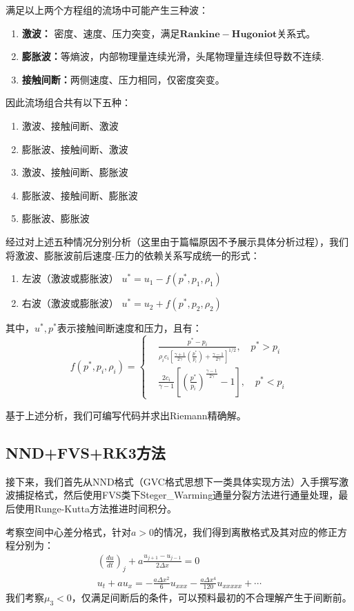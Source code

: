 \documentclass[12pt,a4paper]{article}%
\begin{document}
		满足以上两个方程组的流场中可能产生三种波：
		\begin{enumerate}
		 	\item \textbf{激波：} 密度、速度、压力突变，满足$\mathbf{Rankine-Hugoniot}$关系式。
		 	\item \textbf{膨胀波：}等熵波，内部物理量连续光滑，头尾物理量连续但导数不连续.
		 	\item \textbf{接触间断：}两侧速度、压力相同，仅密度突变。
		\end{enumerate}
		
		因此流场组合共有以下五种：
		\begin{enumerate}
			\item 激波、接触间断、激波
			\item 膨胀波、接触间断、激波
			\item 激波、接触间断、膨胀波
			\item 膨胀波、接触间断、膨胀波
			\item 膨胀波、膨胀波
		\end{enumerate}
		
		经过对上述五种情况分别分析（这里由于篇幅原因不予展示具体分析过程），我们将激波、膨胀波前后速度-压力的依赖关系写成统一的形式：
		\begin{enumerate}
		 	\item 左波（激波或膨胀波） $u^* = u_1 - f(p^*,p_1,\rho_1)$
		 	\item 右波（激波或膨胀波） $u^* = u_2 + f(p^*,p_2,\rho_2)$
		\end{enumerate}
		其中，$u^*,p^*$表示接触间断速度和压力，且有：
		\[
		f(p^*,p_i,\rho_i) = 
		\left\{
		\begin{aligned}
		 	& \frac{p^* - p_i}{\rho_i c_i[\frac{\gamma+1}{2\gamma} (\frac{p^*}{p_i}) + \frac{\gamma-1}{2\gamma}]^{1/2}},\quad p^*>p_i \\
		 	& \frac{2c_i}{\gamma-1}[(\frac{p^*}{p_i})^{\frac{\gamma-1}{2\gamma}} - 1],\quad p^*<p_i
		\end{aligned}
		\right.
		\]
		
		基于上述分析，我们可编写代码并求出Riemann精确解。
		 
		\subsection{NND+FVS+RK3方法}
		接下来，我们首先从NND格式（GVC格式思想下一类具体实现方法）入手撰写激波捕捉格式，然后使用FVS类下Steger\_Warming通量分裂方法进行通量处理，最后使用Runge-Kutta方法推进时间积分。
		
		考察空间中心差分格式，针对$a>0$的情况，我们得到离散格式及其对应的修正方程分别为：
		\begin{gather}
			(\frac{du}{dt})_j + a\frac{u_{j+1}-u_{j-1}}{2\Delta x} = 0 \\
			u_t + au_x = -\frac{a\Delta x^2}{6}u_{xxx} - \frac{a\Delta x^4}{120}u_{xxxxx}+\cdots
		\end{gather}
		我们考察$\mu_3<0$，仅满足间断后的条件，可以预料最初的不合理解产生于间断前。
		
\end{document}
